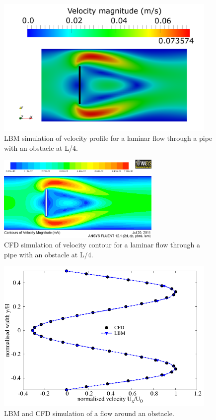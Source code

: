 \begin{figure}[!t]
\centering
\hspace{-13mm}\includegraphics[width=0.95\textwidth]{LBM_Obstacle}
\caption{LBM simulation of velocity profile for a laminar flow through a pipe 
with an obstacle at L/4.}
\label{fig:LBMobstacle}
\end{figure}

\begin{figure}[!h]
\centering
\includegraphics[width=0.7\textwidth]{CFD_Obstacle}
\caption{CFD simulation of velocity contour for a laminar flow through a pipe 
with an obstacle at L/4.}
\label{fig:CFDobstacle}
\end{figure}

\begin{figure}[htbp]
\centering
\includegraphics[width=0.95\textwidth]{Obstacle}
\caption{LBM and CFD simulation of a flow around an obstacle.}
\label{fig:Obstacle}
\end{figure}


